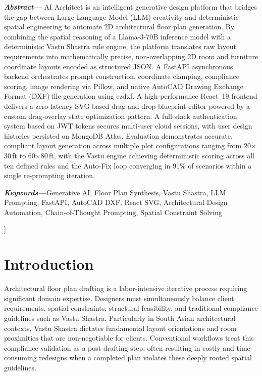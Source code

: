 \documentclass[10pt, twocolumn, letterpaper]{article}
\begin{document}
\begin{center}
\begin{minipage}{0.92\linewidth}
\fontsize{9}{11}\selectfont
\noindent\textbf{\textit{Abstract---}}%
AI Architect is an intelligent generative design platform that bridges the
gap between Large Language Model (LLM) creativity and deterministic spatial
engineering to automate 2D architectural floor plan generation. By combining
the spatial reasoning of a Llama-3-70B inference model with a deterministic
Vastu Shastra rule engine, the platform translates raw layout requirements
into mathematically precise, non-overlapping 2D room and furniture coordinate
layouts encoded as structured JSON. A FastAPI asynchronous backend
orchestrates prompt construction, coordinate clamping, compliance scoring,
image rendering via Pillow, and native AutoCAD Drawing Exchange Format (DXF)
file generation using ezdxf. A high-performance React~19 frontend delivers a
zero-latency SVG-based drag-and-drop blueprint editor powered by a custom
drag-overlay state optimization pattern. A full-stack authentication system
based on JWT tokens secures multi-user cloud sessions, with user design
histories persisted on MongoDB Atlas. Evaluation demonstrates accurate,
compliant layout generation across multiple plot configurations ranging from
20$\times$30\,ft to 60$\times$80\,ft, with the Vastu engine achieving
deterministic scoring across all ten defined rules and the Auto-Fix loop
converging in 91\% of scenarios within a single re-prompting iteration.

\vspace{4pt}
\noindent\textbf{\textit{Keywords---}}Generative AI, Floor Plan Synthesis,
Vastu Shastra, LLM Prompting, FastAPI, AutoCAD DXF, React SVG,
Architectural Design Automation, Chain-of-Thought Prompting,
Spatial Constraint Solving
\end{minipage}

\vspace{12pt}
\end{center}
]%

\section{Introduction}

Architectural floor plan drafting is a labor-intensive iterative process
requiring significant domain expertise. Designers must simultaneously balance
client requirements, spatial constraints, structural feasibility, and
traditional compliance guidelines such as Vastu Shastra. Particularly in
South Asian architectural contexts, Vastu Shastra dictates fundamental layout
orientations and room proximities that are non-negotiable for clients.
Conventional workflows treat this compliance validation as a post-drafting
step, often resulting in costly and time-consuming redesigns when a completed
plan violates these deeply rooted spatial guidelines.
\end{document}
